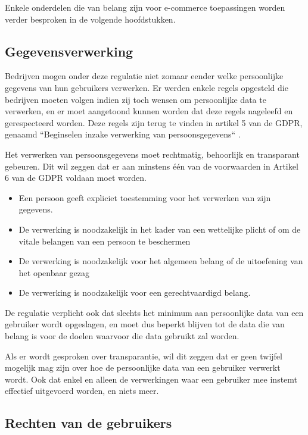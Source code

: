 Enkele onderdelen die van belang zijn voor e-commerce toepassingen worden verder besproken in de volgende hoofdstukken.

\subsection{Gegevensverwerking}
\label{subsec: Gegevensverwerking}

Bedrijven mogen onder deze regulatie niet zomaar eender welke persoonlijke gegevens van hun gebruikers verwerken. Er werden enkele regels opgesteld die bedrijven moeten volgen indien zij toch wensen om persoonlijke data te verwerken, en er moet aangetoond kunnen worden dat deze regels nageleefd en gerespecteerd worden. Deze regels zijn terug te vinden in artikel 5 van de GDPR, genaamd ``Beginselen inzake verwerking van persoonsgegevens`` \autocite{Article5GDPR2018}.

Het verwerken van persoonsgegevens moet rechtmatig, behoorlijk en transparant gebeuren. Dit wil zeggen dat er aan minstens één van de voorwaarden in Artikel 6 van de GDPR voldaan moet worden.
\begin{itemize}
	\item Een persoon geeft expliciet toestemming voor het verwerken van zijn gegevens.
	\item De verwerking is noodzakelijk in het kader van een wettelijke plicht of om de vitale belangen van een persoon te beschermen
	\item  De verwerking is noodzakelijk voor het algemeen belang of de uitoefening van het openbaar gezag
	\item De verwerking is noodzakelijk voor een gerechtvaardigd belang. 
\end{itemize}
\autocite{Article6GDPR2018}

De regulatie verplicht ook dat slechts het minimum aan persoonlijke data van een gebruiker wordt opgeslagen, en moet dus beperkt blijven tot de data die van belang is voor de doelen waarvoor die data gebruikt zal worden.

Als er wordt gesproken over transparantie, wil dit zeggen dat er geen twijfel mogelijk mag zijn over hoe de persoonlijke data van een gebruiker verwerkt wordt. Ook dat enkel en alleen de verwerkingen waar een gebruiker mee instemt effectief uitgevoerd worden, en niets meer.


\subsection{Rechten van de gebruikers}
\label{subsec: Rechten van de gebruikers}

